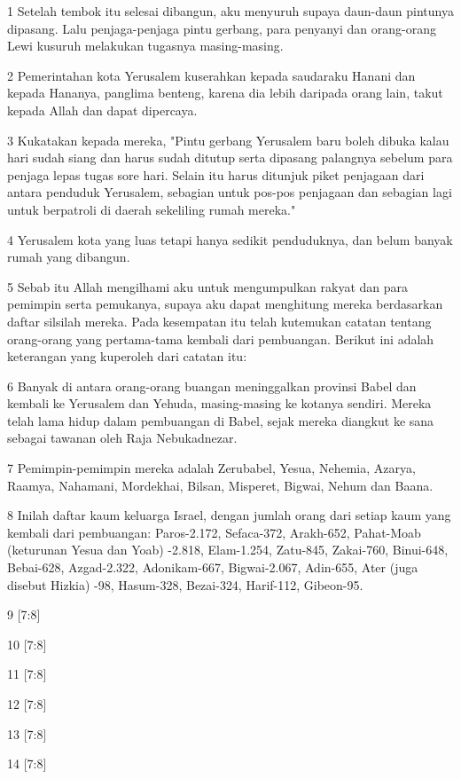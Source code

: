 \par 1 Setelah tembok itu selesai dibangun, aku menyuruh supaya daun-daun pintunya dipasang. Lalu penjaga-penjaga pintu gerbang, para penyanyi dan orang-orang Lewi kusuruh melakukan tugasnya masing-masing.
\par 2 Pemerintahan kota Yerusalem kuserahkan kepada saudaraku Hanani dan kepada Hananya, panglima benteng, karena dia lebih daripada orang lain, takut kepada Allah dan dapat dipercaya.
\par 3 Kukatakan kepada mereka, "Pintu gerbang Yerusalem baru boleh dibuka kalau hari sudah siang dan harus sudah ditutup serta dipasang palangnya sebelum para penjaga lepas tugas sore hari. Selain itu harus ditunjuk piket penjagaan dari antara penduduk Yerusalem, sebagian untuk pos-pos penjagaan dan sebagian lagi untuk berpatroli di daerah sekeliling rumah mereka."
\par 4 Yerusalem kota yang luas tetapi hanya sedikit penduduknya, dan belum banyak rumah yang dibangun.
\par 5 Sebab itu Allah mengilhami aku untuk mengumpulkan rakyat dan para pemimpin serta pemukanya, supaya aku dapat menghitung mereka berdasarkan daftar silsilah mereka. Pada kesempatan itu telah kutemukan catatan tentang orang-orang yang pertama-tama kembali dari pembuangan. Berikut ini adalah keterangan yang kuperoleh dari catatan itu:
\par 6 Banyak di antara orang-orang buangan meninggalkan provinsi Babel dan kembali ke Yerusalem dan Yehuda, masing-masing ke kotanya sendiri. Mereka telah lama hidup dalam pembuangan di Babel, sejak mereka diangkut ke sana sebagai tawanan oleh Raja Nebukadnezar.
\par 7 Pemimpin-pemimpin mereka adalah Zerubabel, Yesua, Nehemia, Azarya, Raamya, Nahamani, Mordekhai, Bilsan, Misperet, Bigwai, Nehum dan Baana.
\par 8 Inilah daftar kaum keluarga Israel, dengan jumlah orang dari setiap kaum yang kembali dari pembuangan: Paros-2.172, Sefaca-372, Arakh-652, Pahat-Moab (keturunan Yesua dan Yoab) -2.818, Elam-1.254, Zatu-845, Zakai-760, Binui-648, Bebai-628, Azgad-2.322, Adonikam-667, Bigwai-2.067, Adin-655, Ater (juga disebut Hizkia) -98, Hasum-328, Bezai-324, Harif-112, Gibeon-95.
\par 9 [7:8]
\par 10 [7:8]
\par 11 [7:8]
\par 12 [7:8]
\par 13 [7:8]
\par 14 [7:8]
